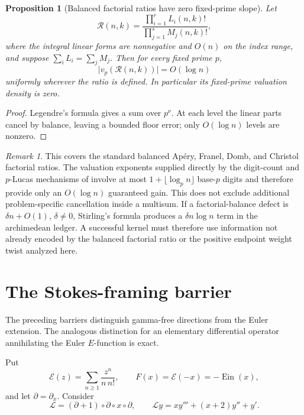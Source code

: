 \documentclass[11pt]{article}
\theoremstyle{keio}
\newtheorem{proposition}[theorem]{Proposition}
\theoremstyle{definition}
\theoremstyle{remark}
\newtheorem{remark}[theorem]{Remark}
\newcommand{\Ein}{\operatorname{Ein}}
\begin{document}
\begin{proposition}[Balanced factorial ratios have zero fixed-prime slope]
\label{prop:balanced-factorial-fixed-p}
Let
\[
 \mathcal R(n,k)=
 \frac{\prod_{i=1}^rL_i(n,k)!}{\prod_{j=1}^sM_j(n,k)!},
\]
where the integral linear forms are nonnegative and \(O(n)\) on the index
range, and suppose \(\sum_iL_i=\sum_jM_j\).  Then for every fixed prime
\(p\),
\[
 \lvert v_p(\mathcal R(n,k))\rvert=O(\log n)
\]
uniformly wherever the ratio is defined.  In particular its fixed-prime
valuation density is zero.
\end{proposition}

\begin{proof}
Legendre's formula gives a sum over \(p^\nu\).  At each level the linear
parts cancel by balance, leaving a bounded floor error; only
\(O(\log n)\) levels are nonzero.
\end{proof}

\begin{remark}
This covers the standard balanced Ap\'ery, Franel, Domb, and Christol
factorial ratios.  The valuation exponents supplied directly by the
digit-count and \(p\)-Lucas mechanisms of \cite{Delaygue2018} involve at
most \(1+\lfloor\log_p n\rfloor\) base-\(p\) digits and therefore provide
only an \(O(\log n)\) guaranteed gain.  This does not exclude additional
problem-specific cancellation inside a multisum.  If a factorial-balance
defect is \(\delta n+O(1)\), \(\delta\ne0\), Stirling's formula produces a
\(\delta n\log n\) term in the archimedean ledger.  A successful kernel
must therefore use information not already encoded by the balanced
factorial ratio or the positive endpoint weight twist analyzed here.
\end{remark}

\section{The Stokes-framing barrier}
\label{sec:stokes-framing}

The preceding barriers distinguish gamma-free directions from the Euler
extension.  The analogous distinction for an elementary differential
operator annihilating the Euler \(E\)-function is exact.

Put
\[
 \mathscr E(z)=\sum_{n\ge1}\frac{z^n}{n\,n!},
 \qquad F(x)=\mathscr E(-x)=-\Ein(x),
\]
and let \(\partial=\partial_x\).  Consider
\begin{equation}\label{eq:euler-E-operator}
 \mathcal L=(\partial+1)\circ\partial\circ x\circ\partial,
 \qquad
 \mathcal Ly=xy'''+(x+2)y''+y'.
\end{equation}
\end{document}
